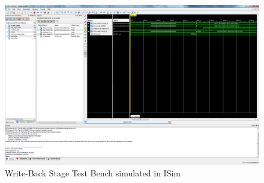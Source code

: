 \begin{figure}
    \includegraphics[width=\textwidth]{illustrations/tb_wb_stage.PNG}
    \caption{Write-Back Stage Test Bench simulated in ISim}
\end{figure}


{}

\nocite{*} %



